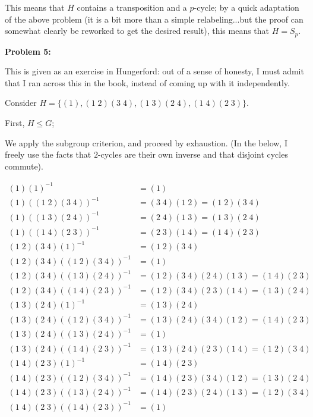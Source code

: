 \documentclass[a4paper,12pt]{article}
\newcommand{\tab}{\hspace{4mm}} %
\newcommand{\shunt}{\vspace{20mm}}
\begin{document}
This means that $H$ contains a transposition and a $p$-cycle; by a quick adaptation of the above problem (it is a bit more than a simple relabeling...but the proof can somewhat clearly be reworked to get the desired result), this means that $H = S_p$.

\shunt

{\bf Problem 5:}

This is given as an exercise in Hungerford: out of a sense of honesty, I must admit that I ran across this in the book, instead of coming up with it independently.

Consider $ H =\{(1), (1 \; 2)(3 \; 4), (1 \; 3) (2 \; 4), (1 \; 4) (2 \; 3)\}$.

First, $H \leq G$;

\tab We apply the subgroup criterion, and proceed by exhaustion. (In the below, I freely use the facts that $2$-cycles are their own inverse and that disjoint cycles commute).

\begin{align*}
(1) (1)^{-1} &= (1)\\
(1) ((1 \; 2)(3 \; 4))^{-1} &= (3 \; 4)(1 \; 2) = (1 \; 2)(3 \; 4)\\
(1) ((1 \; 3) (2 \; 4))^{-1} &= (2 \; 4) (1 \; 3)  =  (1 \; 3) (2 \; 4)\\
(1) ((1 \; 4) (2 \; 3))^{-1} &=  (2 \; 3) (1 \; 4)= (1 \; 4) (2 \; 3)\\
(1 \; 2)(3 \; 4) (1)^{-1} &= (1 \; 2)(3 \; 4)\\
(1 \; 2)(3 \; 4) ((1 \; 2)(3 \; 4))^{-1} &= (1)\\
(1 \; 2)(3 \; 4) ((1 \; 3) (2 \; 4))^{-1} &= (1 \; 2)(3 \; 4) (2 \; 4) (1 \; 3) = (1 \; 4) (2 \; 3)\\
(1 \; 2)(3 \; 4) ((1 \; 4) (2 \; 3))^{-1} &= (1 \; 2)(3 \; 4) (2 \; 3) (1 \; 4) = (1 \; 3) (2 \; 4)\\
(1 \; 3) (2 \; 4) (1)^{-1} &= (1 \; 3) (2 \; 4)\\
(1 \; 3) (2 \; 4) ((1 \; 2)(3 \; 4))^{-1} &= (1 \; 3) (2 \; 4) (3 \; 4) (1 \; 2) =(1 \; 4) (2 \; 3)\\
(1 \; 3) (2 \; 4) ((1 \; 3) (2 \; 4))^{-1} &= (1)\\
(1 \; 3) (2 \; 4) ((1 \; 4) (2 \; 3))^{-1} &= (1 \; 3) (2 \; 4) (2 \; 3) (1 \; 4) = (1 \; 2) (3 \; 4)\\
(1 \; 4) (2 \; 3) (1)^{-1} &= (1 \; 4) (2 \; 3)\\
(1 \; 4) (2 \; 3) ((1 \; 2)(3 \; 4))^{-1} &= (1 \; 4) (2 \; 3) (3 \; 4) (1 \; 2) = (1 \; 3) (2 \; 4)\\
(1 \; 4) (2 \; 3) ((1 \; 3) (2 \; 4))^{-1} &= (1 \; 4) (2 \; 3) (2 \; 4) (1 \; 3) = (1 \; 2) (3 \; 4)\\
(1 \; 4) (2 \; 3) ((1 \; 4) (2 \; 3))^{-1} &= (1)
\end{align*}
\end{document}
